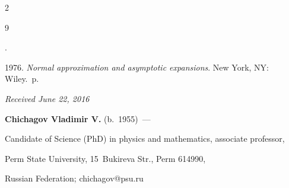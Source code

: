 \begin{multicols}{2}
{{\begin{thebibliography}{9}


. 


1976. \textit{Normal approximation and asymptotic expansions}. New York, NY: Wiley.~p.





   \end{thebibliography}





 }


 }


 








\end{multicols}





\vspace*{-7pt}





\hfill{\small\textit{Received June 22, 2016}}





\vspace*{-20pt}





\Contrl





\noindent


\textbf{Chichagov Vladimir V.} (b.\ 1955)~---


 Candidate of Science (PhD) in physics and mathematics, associate professor, 


 Perm State University, 15~Bukireva Str., Perm 614990, 


 Russian Federation; \mbox{chichagov@psu.ru}


\label{end\stat}








\renewcommand{\bibname}{\protect\rm Литература}


